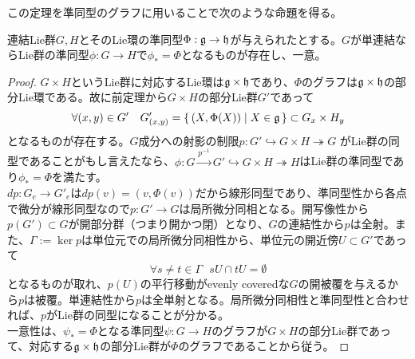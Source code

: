 この定理を準同型のグラフに用いることで次のような命題を得る。
\begin{prop}\label{prop:311}
    連結Lie群$G,H$とそのLie環の準同型$\Phi:\mathfrak{g}\to\mathfrak{h}$が与えられたとする。$G$が単連結ならLie群の準同型$\phi:G\to H$で$\phi_*=\Phi$となるものが存在し、一意。
\end{prop}
\begin{proof}
    $G\times H$というLie群に対応するLie環は$\mathfrak{g}\times\mathfrak{h}$であり、$\Phi$のグラフは$\mathfrak{g}\times\mathfrak{h}$の部分Lie環である。故に前定理から$G\times H$の部分Lie群$G'$であって
    \[\forall(x,y)\in G'\ \ \ G'_{(x,y)}=\set{(X,\Phi(X))}{X\in\g}\subset G_x\times H_y\]
    となるものが存在する。$G$成分への射影の制限$p:G'\hookrightarrow G\times H\twoheadrightarrow G$ がLie群の同型であることがもし言えたなら、$\phi:G\overset{p^{-1}}{\longrightarrow}G'\hookrightarrow G\times H\twoheadrightarrow H$はLie群の準同型であり$\phi_*=\Phi$を満たす。\\
    $dp:G_e\to G'_e$は$dp(v)=(v,\Phi(v))$だから線形同型であり、準同型性から各点で微分が線形同型なので$p:G'\to G$は局所微分同相となる。開写像性から$p(G')\subset G$が開部分群（つまり開かつ閉）となり、$G$の連結性から$p$は全射。また、$\Gamma:=\ker p$は単位元での局所微分同相性から、単位元の開近傍$U\subset G'$であって
    \[\forall s\neq t\in\Gamma\ \ \ sU\cap tU=\emptyset\]
    となるものが取れ、$p(U)$の平行移動がevenly coveredな$G$の開被覆を与えるから$p$は被覆。単連結性から$p$は全単射となる。局所微分同相性と準同型性と合わせれば、$p$がLie群の同型になることが分かる。\\
    一意性は、$\psi_*=\Phi$となる準同型$\psi:G\to H$のグラフが$G\times H$の部分Lie群であって、対応する$\mathfrak{g}\times\mathfrak{h}$の部分Lie群が$\Phi$のグラフであることから従う。
\end{proof}

